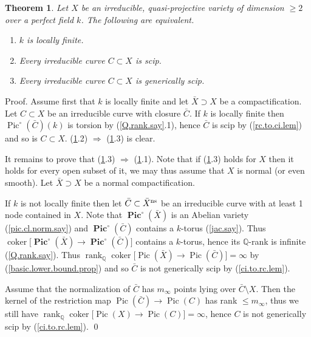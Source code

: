 \documentclass{amsart}
\newtheorem{thm}{Theorem}%
\theoremstyle{definition}
\theoremstyle{remark}
\newcommand{\q}[0]{{\mathbb Q}}
\newcommand{\pic}[0]{\operatorname{Pic}}
\newcommand{\pico}[0]{\operatorname{\mathbf{Pic}}^{\circ}}
\newcommand{\qrank}[0]{\operatorname{rank}_{\q}}
\newcommand{\coker}[0]{\operatorname{coker}}
\begin{document}
\begin{thm}\label{quasifinite.field.thm}
 Let $X$ be an irreducible, quasi-projective variety of dimension $\geq 2$ over a perfect field $k$. 
The following are equivalent.
\begin{enumerate}
\item $k$ is locally finite.
\item Every irreducible curve  $C\subset X$ is scip.
\item Every irreducible curve  $C\subset X$ is generically scip.
\end{enumerate}
\end{thm}

Proof. 
Assume first that $k$ is locally finite and let $\bar X\supset X$
be a compactification.
Let $C\subset X$ be an irreducible curve with closure $\bar C$. If $k$ is locally finite then
$\pic^\circ(\bar C)(k)$ is torsion by (\ref{Q.rank.say}.1), hence 
 $\bar C$ is scip  by (\ref{rc.to.ci.lem}) and so is $C\subset X$.
(\ref{quasifinite.field.thm}.2) $\Rightarrow$ 
(\ref{quasifinite.field.thm}.3) is clear.


It remains to prove that (\ref{quasifinite.field.thm}.3) $\Rightarrow$ 
(\ref{quasifinite.field.thm}.1).  Note that if (\ref{quasifinite.field.thm}.3) holds for $X$ then it holds for every open subset of it, we may thus assume that $X$ is normal (or even smooth).
Let $\bar X\supset X$
be a normal compactification.



If $k$ is not locally finite then let $\bar C\subset \bar X^{\rm ns}$ be an irreducible  curve with at least 1 node contained in $X$. Note that $\pico(\bar X)$ is an Abelian variety
(\ref{pic.cl.norm.say}) and $\pico(\bar C)$ contains a $k$-torus (\ref{jac.say}). 
Thus $\coker\bigl[\pico(\bar X)\to \pico(\bar C)\bigr]$ contains a $k$-torus, 
hence its $\q$-rank is infinite (\ref{Q.rank.say}). 
Thus $\qrank \coker\bigl[\pic(\bar X)\to \pic(\bar C)\bigr]=\infty$ by
(\ref{basic.lower.bound.prop}) and so 
$\bar C$ is not generically scip by  (\ref{ci.to.rc.lem}).

Assume that the normalization of $\bar C$ has $m_\infty$ points lying over
$ \bar C\setminus  X$.  Then the kernel of the restriction map
$\pic(\bar C) \to \pic(C)$ has rank $\leq m_\infty$, thus we still have
$\qrank \coker\bigl[\pic(X)\to \pic(C)\bigr]=\infty$, hence
$C$ is not generically scip by  (\ref{ci.to.rc.lem}). \qed
\end{document}
